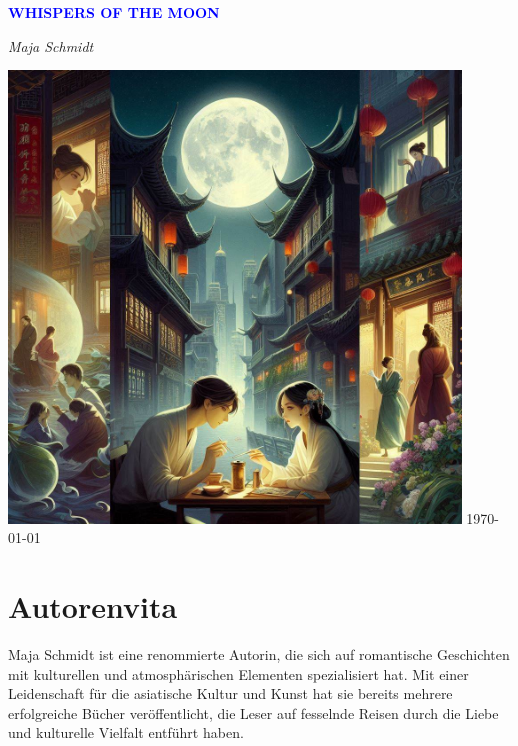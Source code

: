 \documentclass[12pt]{article} %
\begin{document}
\begin{titlepage}
    \centering
    \vspace*{3cm}
    {\Huge\bfseries\textcolor{blue}{\MakeUppercase{ Whispers of the Moon }}\par} %
    \vspace{0.5cm} %
    {\Large\textit{ Maja Schmidt }\par} %
    \vfill
    \includegraphics[width=0.9\textwidth]{ cover.jpg } %
    \vfill
    \today
\end{titlepage}

\section*{Autorenvita}
\vspace{4cm} %
\begin{minipage}{\textwidth}
    Maja Schmidt ist eine renommierte Autorin, die sich auf romantische Geschichten mit kulturellen und atmosphärischen Elementen spezialisiert hat. Mit einer Leidenschaft für die asiatische Kultur und Kunst hat sie bereits mehrere erfolgreiche Bücher veröffentlicht, die Leser auf fesselnde Reisen durch die Liebe und kulturelle Vielfalt entführt haben.
\end{minipage}
\end{document}
